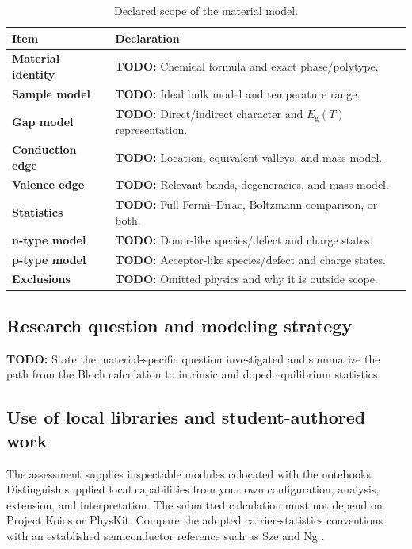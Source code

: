 \documentclass[11pt,a4paper]{article}
\newcommand{\Eg}{E_{\mathrm g}}
\newcommand{\todo}[1]{\textcolor{BrickRed}{\textbf{TODO:} #1}}
\begin{document}
\begin{table}[htbp]
  \centering
  \caption{Declared scope of the material model.}
  \label{tab:declaration}
  \begin{tabularx}{\textwidth}{@{}>{\bfseries}p{}X@{}}
    \toprule
    Item & Declaration \\
    \midrule
    Material identity & \todo{Chemical formula and exact phase/polytype.} \\
    Sample model & \todo{Ideal bulk model and temperature range.} \\
    Gap model & \todo{Direct/indirect character and $\Eg(T)$ representation.} \\
    Conduction edge & \todo{Location, equivalent valleys, and mass model.} \\
    Valence edge & \todo{Relevant bands, degeneracies, and mass model.} \\
    Statistics & \todo{Full Fermi--Dirac, Boltzmann comparison, or both.} \\
    n-type model & \todo{Donor-like species/defect and charge states.} \\
    p-type model & \todo{Acceptor-like species/defect and charge states.} \\
    Exclusions & \todo{Omitted physics and why it is outside scope.} \\
    \bottomrule
  \end{tabularx}
\end{table}

\subsection{Research question and modeling strategy}

\todo{State the material-specific question investigated and summarize the path
from the Bloch calculation to intrinsic and doped equilibrium statistics.}

\subsection{Use of local libraries and student-authored work}

The assessment supplies inspectable modules colocated with the notebooks.
Distinguish supplied local capabilities from your own configuration, analysis,
extension, and interpretation.  The submitted calculation must not depend on
Project Koios or PhysKit. Compare the adopted carrier-statistics conventions
with an established semiconductor reference such as Sze and Ng \cite{sze-ng}.
\end{document}
